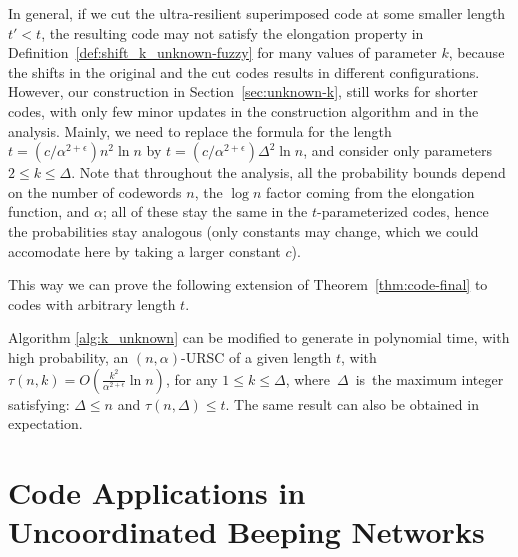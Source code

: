 \documentclass[11pt]{article}
\begin{document}
In general, if we cut the ultra-resilient superimposed code at some smaller length $t'<t$, the resulting code may not satisfy the elongation property in Definition~\ref{def:shift_k_unknown-fuzzy} for many values of parameter $k$, because the shifts in the original and the cut codes results in different configurations. However, our construction in Section~\ref{sec:unknown-k}, still works for shorter codes, with only few minor updates in the construction algorithm and in the analysis.
Mainly, we need to replace the formula for the length $t=(c/\alpha^{2+\epsilon}) n^2 \ln n$ by $t=(c/\alpha^{2+\epsilon}) \Delta^2 \ln n$, and consider only parameters $2\le k\le \Delta$. Note that throughout the analysis, all the probability bounds depend on the number of codewords $n$, the $\log n$ factor coming from the elongation function, and $\alpha$; all of these stay the same in the $t$-parameterized codes, hence the probabilities stay analogous (only constants may change, which we could accomodate here by taking a larger constant $c$).


This way we can prove the following extension of 
Theorem~\ref{thm:code-final} to codes with arbitrary length $t$.

\begin{theorem}
\label{thm:unknown-k-shorter-codes}
Algorithm \ref{alg:k_unknown} can be modified to generate in polynomial time, with high probability, 
an $(n,\alpha)$-URSC of a given length $t$, with \elongation\ 
$\tau(n,k) = O\left(\frac{k^2}{\alpha^{2+\epsilon}} \ln n\right)$, for any $1\le k \le \Delta$, where~$\Delta$~is~the maximum integer satisfying: $\Delta\le n$ and $\tau(n,\Delta)\le t$. 
The same result can also be obtained in expectation.
\end{theorem}


\section{Code Applications
in Uncoordinated Beeping Networks}
\label{sec:beeping}
\end{document}
